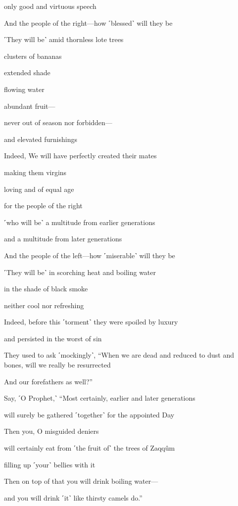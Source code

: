 only good and virtuous speech

And the people of the right—how ˹blessed˺ will they be

˹They will be˺ amid thornless lote trees

clusters of bananas

extended shade

flowing water

abundant fruit—

never out of season nor forbidden—

and elevated furnishings

Indeed, We will have perfectly created their mates

making them virgins

loving and of equal age

for the people of the right

˹who will be˺ a multitude from earlier generations

and a multitude from later generations

And the people of the left—how ˹miserable˺ will they be

˹They will be˺ in scorching heat and boiling water

in the shade of black smoke

neither cool nor refreshing

Indeed, before this ˹torment˺ they were spoiled by luxury

and persisted in the worst of sin

They used to ask ˹mockingly˺, “When we are dead and reduced to dust and bones, will we really be resurrected

And our forefathers as well?”

Say, ˹O Prophet,˺ “Most certainly, earlier and later generations

will surely be gathered ˹together˺ for the appointed Day

Then you, O misguided deniers

will certainly eat from ˹the fruit of˺ the trees of Zaqqûm

filling up ˹your˺ bellies with it

Then on top of that you will drink boiling water—

and you will drink ˹it˺ like thirsty camels do.”

